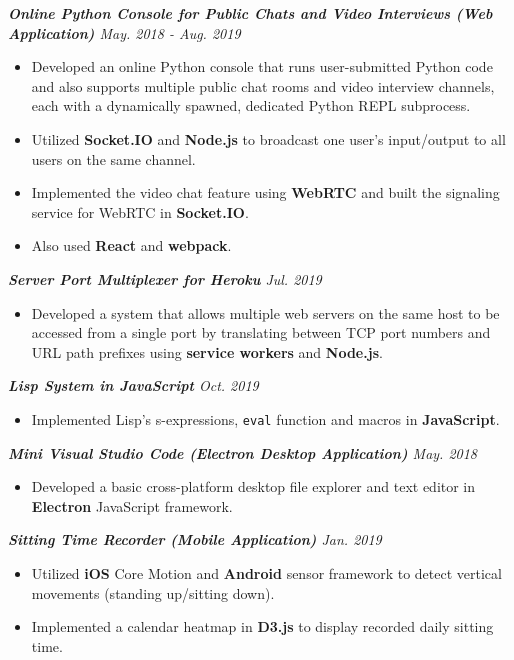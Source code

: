 \documentclass[10pt]{article}
\begin{document}
%
{\itshape {\bfseries Online Python Console for Public Chats and Video Interviews (Web Application)}  \hfill May. 2018 - Aug. 2019}
\begin{itemize}[leftmargin=15pt, noitemsep, topsep=0pt]
\item Developed an online Python console that runs user-submitted Python code and also supports multiple public chat rooms and video interview channels, each with a dynamically spawned, dedicated Python REPL subprocess.
\item Utilized \textbf{Socket.IO} and \textbf{Node.js} to broadcast one user’s input/output to all users on the same channel.
\item Implemented the video chat feature using \textbf{WebRTC} and built the signaling service for WebRTC in \textbf{Socket.IO}.
\item Also used \textbf{React} and \textbf{webpack}.

\end{itemize}
\vspace{0.5em}
%
{\itshape {\bfseries Server Port Multiplexer for Heroku}  \hfill Jul. 2019}
\begin{itemize}[leftmargin=15pt, noitemsep, topsep=0pt]
\item Developed a system that allows multiple web servers on the same host to be accessed from a single port by translating between TCP port numbers and URL path prefixes using \textbf{service workers} and \textbf{Node.js}. 
\end{itemize}
\vspace{0.2em}
%
{\itshape {\bfseries Lisp System in JavaScript}  \hfill Oct. 2019}
\begin{itemize}[leftmargin=15pt, noitemsep, topsep=0pt]
\item Implemented Lisp's s-expressions, \texttt{eval} function and macros in \textbf{JavaScript}.
\end{itemize}
\vspace{0.2em}
%
{\itshape {\bfseries Mini Visual Studio Code (Electron Desktop Application)}  \hfill May. 2018}
\begin{itemize}[leftmargin=15pt, noitemsep, topsep=0pt]
\item Developed a basic cross-platform desktop file explorer and text editor in \textbf{Electron} JavaScript framework.
\end{itemize}
\vspace{0.2em}
%
{\itshape {\bfseries Sitting Time Recorder (Mobile Application)}  \hfill Jan. 2019}
\begin{itemize}[leftmargin=15pt, noitemsep, topsep=0pt]
\item Utilized \textbf{iOS} Core Motion and \textbf{Android} sensor framework to detect vertical movements (standing up/sitting down).
\item Implemented a calendar heatmap in \textbf{D3.js} to display recorded daily sitting time.
\end{itemize}
%
\vspace{-0.5em}
\end{document}
